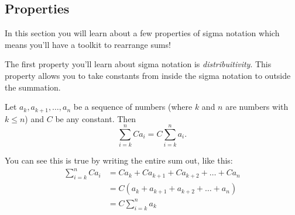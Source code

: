 \documentclass[
  12pt,
  a4paper, oneside]{starmastarticle}
\begin{document}
\hypertarget{properties}{%
\subsection{Properties}\label{properties}}

In this section you will learn about a few properties of sigma notation
which means you'll have a toolkit to rearrange sums!

The first property you'll learn about sigma notation is
\emph{distribuitivity}. This property allows you to take constants from
inside the sigma notation to outside the summation.

\begin{tcolorbox}[enhanced jigsaw, opacitybacktitle=0.6, toprule=.15mm, colback=white, colbacktitle=quarto-callout-note-color!10!white, left=2mm, colframe=quarto-callout-note-color-frame, titlerule=0mm, bottomtitle=1mm, toptitle=1mm, bottomrule=.15mm, opacityback=0, title=\textcolor{quarto-callout-note-color}{\faInfo}\hspace{0.5em}{Distribuitivity}, rightrule=.15mm, coltitle=black, leftrule=.75mm, breakable, arc=.35mm]
Let \(a_k,a_{k+1}, \ldots, a_n\) be a sequence of numbers (where \(k\)
and \(n\) are numbers with \(k \leq n\)) and \(C\) be any constant. Then
\[\sum_{i=k}^n Ca_i = C \sum_{i=k}^n a_i.\]
\end{tcolorbox}

You can see this is true by writing the entire sum out, like this:
\[\begin{equation}\begin{split} \sum_{i=k}^nCa_i & = Ca_k + Ca_{k+1} + Ca_{k+2} + \ldots + Ca_n \\ & = C(a_k + a_{k+1} + a_{k+2} + \ldots + a_n) \\ & = C\sum_{i=k}^n a_k \end{split}\end{equation}\]

\begin{tcolorbox}[enhanced jigsaw, left=2mm, colframe=quarto-callout-note-color-frame, toprule=.15mm, bottomrule=.15mm, opacityback=0, colback=white, arc=.35mm, leftrule=.75mm, breakable, rightrule=.15mm]
\begin{minipage}[t]{5.5mm}
\textcolor{quarto-callout-note-color}{\faInfo}
\end{minipage}%
\begin{minipage}[t]{\textwidth - 5.5mm}

\end{minipage}%
\end{tcolorbox}
\end{document}
